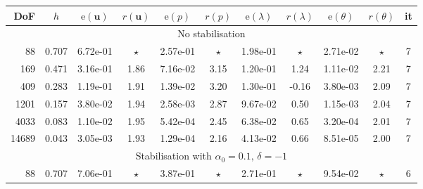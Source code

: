 \documentclass[onefignum,onetabnum,reqno,a4paper,final]{siamart250211}
\newcommand\bu{\boldsymbol{u}}
\newcommand\0{\mathbf{0}}
\numberwithin{figure}{section}
\numberwithin{table}{section}
\begin{document}
{\begin{table}[t!]
    \setlength{\tabcolsep}{3.5pt}
    \centering 
    {\small\begin{tabular}{|rcccccccccc|}
            \hline\hline
            DoF   &   $h$  & $\mathrm{e}(\bu)$  &   $r(\bu)$   &   $\mathrm{e}(p)$  &   $r(p)$  &  $\mathrm{e}(\lambda)$  &   $r(\lambda) $ &  $\mathrm{e}(\theta)$  &  $r(\theta)$  &   it \\
            \hline 
            \multicolumn{11}{|c|}{No stabilisation} \\
            \hline
            88 & 0.707 & 6.72e-01 & $\star$ & 2.57e-01 & $\star$ & 1.98e-01 & $\star$ & 2.71e-02 & $\star$ &  7 \\
           169 & 0.471 & 3.16e-01 & 1.86 & 7.16e-02 & 3.15 & 1.20e-01 & 1.24 & 1.11e-02 & 2.21 &  7\\
           409 & 0.283 & 1.19e-01 & 1.91 & 1.39e-02 & 3.20 & 1.30e-01 & -0.16 & 3.80e-03 & 2.09 &  7\\
           1201 & 0.157 & 3.80e-02 & 1.94 & 2.58e-03 & 2.87 & 9.67e-02 & 0.50 & 1.15e-03 & 2.04 &  7\\
           4033 & 0.083 & 1.10e-02 & 1.95 & 5.42e-04 & 2.45 & 6.38e-02 & 0.65 & 3.20e-04 & 2.01 &  7\\
           14689 & 0.043 & 3.05e-03 & 1.93 & 1.29e-04 & 2.16 & 4.13e-02 & 0.66 & 8.51e-05 & 2.00 &  7\\
            \hline 
            \multicolumn{11}{|c|}{Stabilisation with $\alpha_0=0.1,\,\delta=-1$} \\
            \hline
            88 & 0.707 & 7.06e-01 & $\star$ & 3.87e-01 & $\star$ & 2.71e-01 & $\star$ & 9.54e-02 & $\star$ &  6\\

\end{tabular}}
\end{table}}
\end{document}
